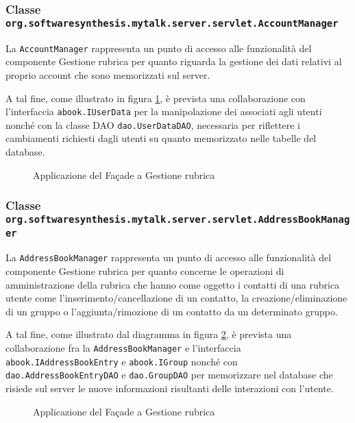 \subsubsection*{Classe \texttt{org.softwaresynthesis.mytalk.server.servlet.AccountManager}}
La  \texttt{AccountManager} rappresenta un punto di accesso alle funzionalità del componente \textsf{Gestione rubrica} per quanto riguarda la gestione dei dati relativi al proprio account che sono memorizzati sul server.

A tal fine, come illustrato in figura \ref{fig:facadeaddressbook1}, è prevista una collaborazione con l'interfaccia \texttt{abook.IUserData} per la manipolazione dei  associati agli utenti nonché con la classe DAO \texttt{dao.UserDataDAO}, necessaria per riflettere i cambiamenti richiesti dagli utenti su quanto memorizzato nelle tabelle del database.

\begin{figure}[H]
  \centering
  \caption{Applicazione del  Façade a \textsf{Gestione rubrica}}\label{fig:facadeaddressbook1}
\end{figure}

\subsubsection*{Classe \texttt{org.softwaresynthesis.mytalk.server.servlet.AddressBookManager}}
La  \texttt{AddressBookManager} rappresenta un punto di accesso alle funzionalità del componente \textsf{Gestione rubrica} per quanto concerne le operazioni di amministrazione della rubrica che hanno come oggetto i contatti di una rubrica utente come l'inserimento/cancellazione di un contatto, la creazione/eliminazione di un gruppo o l'aggiunta/rimozione di un contatto da un determinato gruppo.

A tal fine, come illustrato dal diagramma in figura \ref{fig:facadeaddressbook2}, è prevista una collaborazione fra la  \texttt{AddressBookManager} e l'interfaccia \texttt{abook.IAddressBookEntry} e \texttt{abook.IGroup} nonché con \texttt{dao.AddressBookEntryDAO} e \texttt{dao.GroupDAO} per memorizzare nel database che risiede sul server le nuove informazioni risultanti delle interazioni con l'utente.

\begin{figure}[H]
  \centering
  \caption{Applicazione del  Façade a \textsf{Gestione rubrica}}\label{fig:facadeaddressbook2}
\end{figure}


